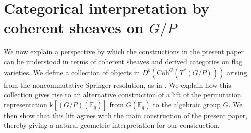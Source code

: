 \documentclass{amsart}
\theoremstyle{definition}
\begin{document}
\section{Categorical interpretation by coherent sheaves on $G/P$}\label{sec:categorification}

We now explain a perspective by which the constructions in the present paper can be understood in terms of coherent sheaves and derived categories on flag varieties. We define a collection of objects in $D^b(\mathrm{Coh}^G(T^*(G/P)))$ arising from the noncommutative Springer resolution, as in \cite{AB, BezTilt, BM}. We explain how this collection gives rise to an alternative construction of a lift of the permutation representation $\mathsf{k}[(G/P)(\mathbb{F}_q)]$ from $G(\mathbb{F}_q)$ to the algebraic group $G$. We then show that this lift agrees with the main construction of the present paper, thereby giving a natural geometric interpretation for our construction.
\end{document}

